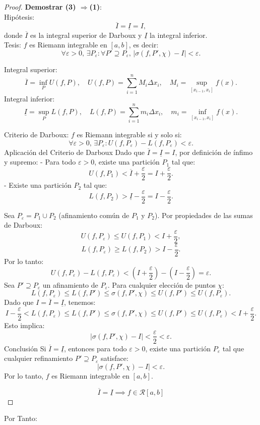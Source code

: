 \documentclass{article}
\begin{document}
	\begin{proof}\textbf{Demostrar (3) \(\Rightarrow\)(1)}:\\
		Hipótesis:
		\[
		\overline{I} = \underline{I} = I,
		\]  
		donde \( \overline{I} \) es la integral superior de Darboux y \( \underline{I} \) la integral inferior.\\
		Tesis: 
		\( f \) es Riemann integrable en \([a, b]\), es decir:  
		\[
		\forall \varepsilon > 0,\, \exists P_\varepsilon : \forall P' \supseteq P_\varepsilon,\, |\sigma(f, P', \chi) - I| < \varepsilon.
		\]
		
		  Integral superior:
		 \[
		 \overline{I} = \inf_{P} U(f, P), \quad U(f, P) = \sum_{i=1}^n M_i \Delta x_i, \quad M_i = \sup_{[x_{i-1}, x_i]} f(x).
		 \]  
		 Integral inferior:
		 \[
		 \underline{I} = \sup_{P} L(f, P), \quad L(f, P) = \sum_{i=1}^n m_i \Delta x_i, \quad m_i = \inf_{[x_{i-1}, x_i]} f(x).
		 \]  
		 
		Criterio de Darboux:  
		\( f \) es Riemann integrable si y solo si:  
		\[
		\forall \varepsilon > 0,\, \exists P_\varepsilon : U(f, P_\varepsilon) - L(f, P_\varepsilon) < \varepsilon.
		\]
		Aplicación del Criterio de Darboux
		Dado que \( \overline{I} = \underline{I} = I \), por definición de ínfimo y supremo:  
		- Para todo \( \varepsilon > 0 \), existe una partición \( P_1 \) tal que:  
		\[
		U(f, P_1) < \overline{I} + \frac{\varepsilon}{2} = I + \frac{\varepsilon}{2}.
		\]  
		- Existe una partición \( P_2 \) tal que:  
		\[
		L(f, P_2) > \underline{I} - \frac{\varepsilon}{2} = I - \frac{\varepsilon}{2}.
		\]  
		
		Sea \( P_\varepsilon = P_1 \cup P_2 \) (afinamiento común de \( P_1 \) y \( P_2 \)). Por propiedades de las sumas de Darboux:  
		\[
		U(f, P_\varepsilon) \leq U(f, P_1) < I + \frac{\varepsilon}{2},
		\]  
		\[
		L(f, P_\varepsilon) \geq L(f, P_2) > I - \frac{\varepsilon}{2}.
		\]  
		Por lo tanto:  
		\[
		U(f, P_\varepsilon) - L(f, P_\varepsilon) < \left(I + \frac{\varepsilon}{2}\right) - \left(I - \frac{\varepsilon}{2}\right) = \varepsilon.
		\]  
		Sea \( P' \supseteq P_\varepsilon \) un afinamiento de \( P_\varepsilon \). Para cualquier elección de puntos \( \chi \):  
		\[
		L(f, P_\varepsilon) \leq L(f, P') \leq \sigma(f, P', \chi) \leq U(f, P') \leq U(f, P_\varepsilon).
		\]  
		Dado que \( I = \overline{I} = \underline{I} \), tenemos:  
		\[
		I - \frac{\varepsilon}{2} < L(f, P_\varepsilon) \leq L(f, P') \leq \sigma(f, P', \chi) \leq U(f, P') \leq U(f, P_\varepsilon) < I + \frac{\varepsilon}{2}.
		\]  
		Esto implica:  
		\[
		|\sigma(f, P', \chi) - I| < \frac{\varepsilon}{2} < \varepsilon.
		\]  
		Conclusión
		Si \( \overline{I} = \underline{I} \), entonces para todo \( \varepsilon > 0 \), existe una partición \( P_\varepsilon \) tal que cualquier refinamiento \( P' \supseteq P_\varepsilon \) satisface:  
		\[
		|\sigma(f, P', \chi) - I| < \varepsilon.
		\]  
		Por lo tanto, \( f \) es Riemann integrable en \([a, b]\).  
		
		\[
		\boxed{\overline{I} = \underline{I} \implies f \in \mathcal{R}[a, b]}
		\]
		
		
	\end{proof}
	
	Por Tanto:\\
	
	
\end{document}
